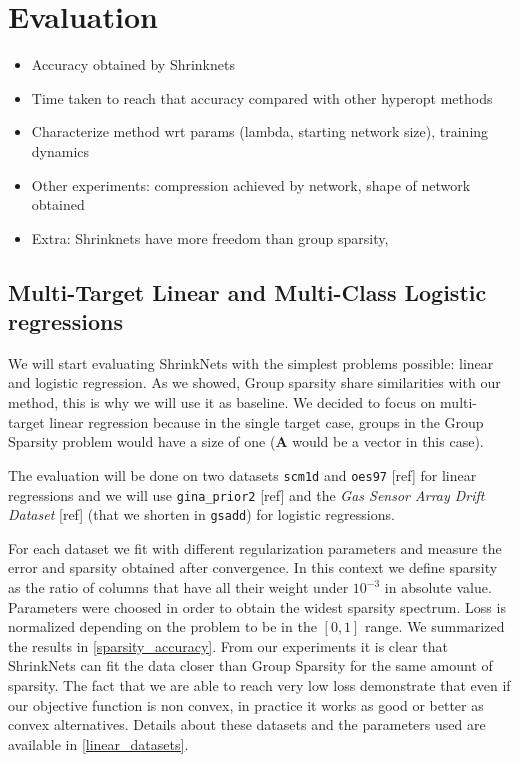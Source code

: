 \section{Evaluation}

\begin{itemize}
  \item Accuracy obtained by Shrinknets
  \item Time taken to reach that accuracy compared with other hyperopt methods
  \item Characterize method wrt params (lambda, starting network size), training dynamics
  \item Other experiments: compression achieved by network, shape of network
  obtained
  \item Extra: Shrinknets have more freedom than group sparsity,  
\end{itemize}

\subsection{Multi-Target Linear and Multi-Class Logistic regressions}

We will start evaluating ShrinkNets with the simplest problems possible: linear
and logistic regression. As we showed, Group sparsity share similarities with
our method, this is why we will use it as baseline. We decided to focus on
multi-target linear regression because in the single target case, groups in the
Group Sparsity problem would have a size of one ($\bm{A}$ would be a vector in this
case).

The evaluation will be done on two datasets \texttt{scm1d} and \texttt{oes97}
[ref] for linear regressions and we will use \texttt{gina\_prior2} [ref] and
the \textit{Gas Sensor Array Drift Dataset} [ref] (that we shorten in
\texttt{gsadd}) for logistic regressions.

For each dataset we fit with different regularization parameters and measure
the error and sparsity obtained after convergence. In this context we define sparsity as the ratio of columns that have all their weight under $10^{-3}$ in absolute value. Parameters were choosed in
order to obtain the widest sparsity spectrum. Loss is normalized depending on the problem to be in the $[0, 1]$ range. We summarized the results in
\cref{sparsity_accuracy}. From our experiments it is clear that ShrinkNets can fit the data closer than Group Sparsity for the same amount of sparsity. The fact that we are able to reach very low loss demonstrate that even if our objective function is non convex, in practice it works as good or better as convex alternatives. Details about these datasets and the parameters used
are available in \cref{linear_datasets}.

